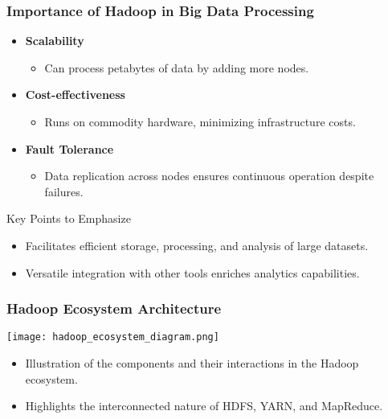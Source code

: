 \documentclass[aspectratio=169]{beamer}
\begin{document}
\begin{frame}[fragile]
    \frametitle{Importance of Hadoop in Big Data Processing}
    \begin{itemize}
        \item \textbf{Scalability}
        \begin{itemize}
            \item Can process petabytes of data by adding more nodes.
        \end{itemize}
        
        \item \textbf{Cost-effectiveness}
        \begin{itemize}
            \item Runs on commodity hardware, minimizing infrastructure costs.
        \end{itemize}
        
        \item \textbf{Fault Tolerance}
        \begin{itemize}
            \item Data replication across nodes ensures continuous operation despite failures.
        \end{itemize}
    \end{itemize}
    
    \begin{block}{Key Points to Emphasize}
        \begin{itemize}
            \item Facilitates efficient storage, processing, and analysis of large datasets.
            \item Versatile integration with other tools enriches analytics capabilities.
        \end{itemize}
    \end{block}
\end{frame}

\begin{frame}[fragile]
    \frametitle{Hadoop Ecosystem Architecture}
    \begin{center}
        \texttt{[image: hadoop\_ecosystem\_diagram.png]} %
    \end{center}
    \begin{itemize}
        \item Illustration of the components and their interactions in the Hadoop ecosystem.
        \item Highlights the interconnected nature of HDFS, YARN, and MapReduce.
    \end{itemize}
\end{frame}
\end{document}
